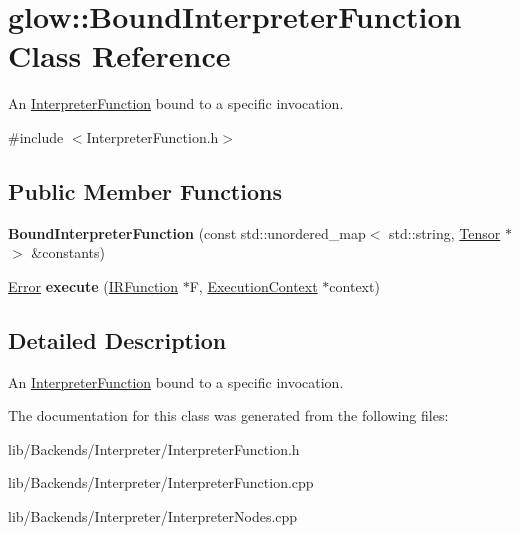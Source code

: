 \hypertarget{classglow_1_1_bound_interpreter_function}{}\section{glow\+:\+:Bound\+Interpreter\+Function Class Reference}
\label{classglow_1_1_bound_interpreter_function}


An \hyperlink{classglow_1_1_interpreter_function}{Interpreter\+Function} bound to a specific invocation.  




{\ttfamily \#include $<$Interpreter\+Function.\+h$>$}

\subsection*{Public Member Functions}
\begin{DoxyCompactItemize}
\item 
\mbox{\label{classglow_1_1_bound_interpreter_function_a8276daa31158b91d02c8a5d207e6afa0}} 
{\bfseries Bound\+Interpreter\+Function} (const std\+::unordered\+\_\+map$<$ std\+::string, \hyperlink{classglow_1_1_tensor}{Tensor} $\ast$$>$ \&constants)
\item 
\mbox{\label{classglow_1_1_bound_interpreter_function_ae15fa28dc2c7a706d8b21c1f00b3cad5}} 
\hyperlink{namespaceglow_afdb176c3a672ef66db0ecfc19a8d39bf}{Error} {\bfseries execute} (\hyperlink{classglow_1_1_i_r_function}{I\+R\+Function} $\ast$F, \hyperlink{classglow_1_1_execution_context}{Execution\+Context} $\ast$context)
\end{DoxyCompactItemize}


\subsection{Detailed Description}
An \hyperlink{classglow_1_1_interpreter_function}{Interpreter\+Function} bound to a specific invocation. 

The documentation for this class was generated from the following files\+:\begin{DoxyCompactItemize}
\item 
lib/\+Backends/\+Interpreter/Interpreter\+Function.\+h\item 
lib/\+Backends/\+Interpreter/Interpreter\+Function.\+cpp\item 
lib/\+Backends/\+Interpreter/Interpreter\+Nodes.\+cpp\end{DoxyCompactItemize}
